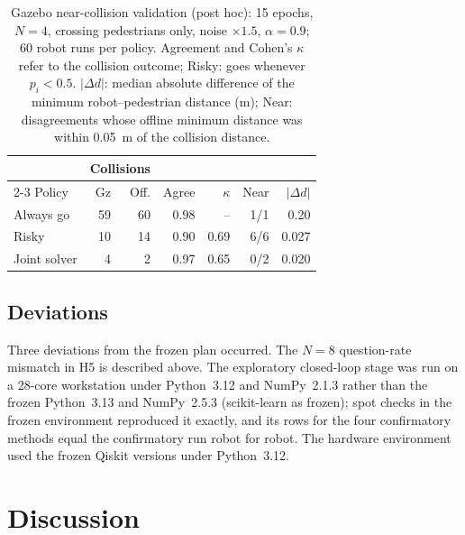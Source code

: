 \documentclass[a4paper,fleqn]{cas-dc}
\begin{document}
\begin{table}
\centering
\caption{Gazebo near-collision validation (post hoc): 15 epochs, $N = 4$, crossing pedestrians only, noise $\times 1.5$, $\alpha = 0.9$; 60 robot runs per policy. Agreement and Cohen's $\kappa$ refer to the collision outcome; Risky: goes whenever $p_i < 0.5$. $|\Delta d|$: median absolute difference of the minimum robot--pedestrian distance (m); Near: disagreements whose offline minimum distance was within \SI{0.05}{m} of the collision distance.}
\label{tab:stress}
\begin{tabular*}{\columnwidth}{@{\extracolsep{\fill}}lrrrrrr}
\toprule
 & \multicolumn{2}{c}{Collisions} & & & & \\
\cmidrule(lr){2-3}
Policy & Gz & Off. & Agree & $\kappa$ & Near & $|\Delta d|$ \\
\midrule
Always go & 59 & 60 & 0.98 & -- & 1/1 & 0.20 \\
Risky & 10 & 14 & 0.90 & 0.69 & 6/6 & 0.027 \\
Joint solver & 4 & 2 & 0.97 & 0.65 & 0/2 & 0.020 \\
\bottomrule
\end{tabular*}
\end{table}

\subsection{Deviations}
\label{sec:res-dev}

Three deviations from the frozen plan occurred. The $N = 8$ question-rate mismatch in H5 is described above. The exploratory closed-loop stage was run on a 28-core workstation under Python~3.12 and NumPy~2.1.3 rather than the frozen Python~3.13 and NumPy~2.5.3 (scikit-learn as frozen); spot checks in the frozen environment reproduced it exactly, and its rows for the four confirmatory methods equal the confirmatory run robot for robot. The hardware environment used the frozen Qiskit versions under Python~3.12.


\section{Discussion}
\label{sec:discussion}
\end{document}
